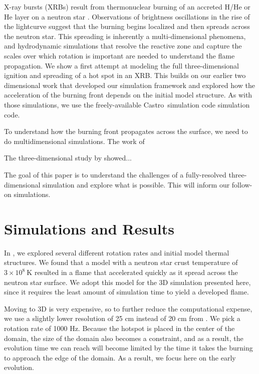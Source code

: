 \documentclass[preprint,times,tighten]{aastex631}
\newcommand{\castro}{{\sf Castro}}
\begin{document}
X-ray bursts (XRBs) result from thermonuclear burning of an accreted
H/He or He layer on a neutron star \citep{galloway:2017}.
Observations of brightness oscillations in the rise of the lightcurve
suggest that the burning begins localized and then spreads across the
neutron star.  This spreading is inherently a multi-dimensional
phenomena, and hydrodynamic simulations that resolve the reactive zone
and capture the scales over which rotation is important are needed to
understand the flame propagation.  We show a first attempt at modeling
the full three-dimensional ignition and spreading of a hot spot in an
XRB.  This builds on our earlier two dimensional work
\citep{eiden:2020,harpole:2021} that developed our simulation
framework and explored how the acceleration of the burning front
depends on the initial model structure.  As with those simulations, we
use the freely-available \castro\ simulation code
\citep{castro,castro_joss} simulation code.


To understand how the burning front propagates across the surface, we
need to do multidimensional simulations.  The work of
\citet{cavecchi:2013,art-2015-cavecchi-etal,art-2016-cavecchi-etal}

The three-dimensional study by \citet{Cavecchi2019} showed...

The goal of this paper is to understand the challenges of a fully-resolved
three-dimensional simulation and explore what is possible.  This will inform
our follow-on simulations.

\section{Simulations and Results}\label{Sec:results}

In \citet{harpole:2021}, we explored several different rotation rates
and initial model thermal structures.  We found that a model with a
neutron star crust temperature of $3\times 10^8~\mathrm{K}$ resulted
in a flame that accelerated quickly as it spread across the neutron
star surface.  We adopt this model for the 3D simulation presented
here, since it requires the least amount of simulation time to yield a
developed flame.  


Moving to 3D is very expensive, so to further reduce the computational
expense, we use a slightly lower resolution of 25 cm instead of 20 cm
from \citet{harpole:2021}.  We pick a rotation rate of 1000 Hz.
Because the hotspot is placed in the center of the domain, the size of
the domain also becomes a constraint, and as a result, the evolution
time we can reach will become limited by the time it takes the burning
to approach the edge of the domain.  As a result, we focus here on the
early evolution.
\end{document}
